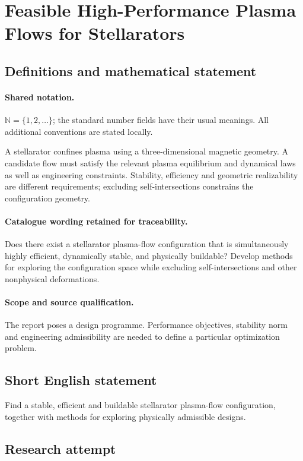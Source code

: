 \documentclass[11pt]{article}
\begin{document}
\section{Feasible High-Performance Plasma Flows for Stellarators}\label{statement}

\subsection{Definitions and mathematical statement}

\paragraph{Shared notation.}$\mathbb N=\{1,2,\ldots\}$; the standard number fields have their usual meanings. All additional conventions are stated locally.


A stellarator confines plasma using a three-dimensional magnetic geometry. A candidate flow must satisfy the relevant plasma equilibrium and dynamical laws as well as engineering constraints. Stability, efficiency and geometric realizability are different requirements; excluding self-intersections constrains the configuration geometry.

\paragraph{Catalogue wording retained for traceability.}
Does there exist a stellarator plasma-flow configuration that is simultaneously highly efficient, dynamically stable, and physically buildable? Develop methods for exploring the configuration space while excluding self-intersections and other nonphysical deformations.

\paragraph{Scope and source qualification.}The report poses a design programme. Performance objectives, stability norm and engineering admissibility are needed to define a particular optimization problem.
\subsection{Short English statement}
Find a stable, efficient and buildable stellarator plasma-flow configuration, together with methods for exploring physically admissible designs.
\subsection{Research attempt}
\end{document}
